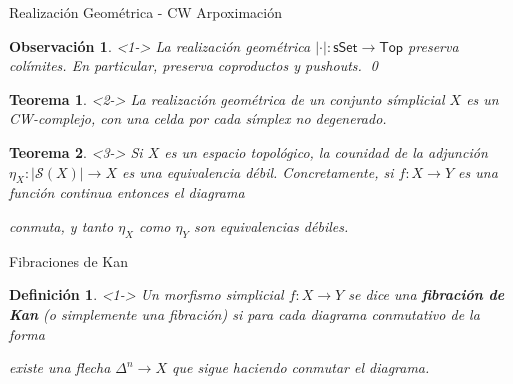 \documentclass[11pt]{beamer}
\newcommand{\cat}[1]{\mathsf{#1}}
\renewcommand{\ss}[1]{\Delta^{#1}}
\newcommand{\horn}[2]{\Lambda^{#1}_{#2}}
\newtheorem{defs}{Definición}
\newtheorem{teo}{Teorema}
\newtheorem{obs}{Observación}
\begin{document}
\begin{frame}{Realización Geométrica - CW Arpoximación}
\begin{obs} <1-> La realización geométrica $| \cdot | : \cat{sSet} \to \cat{Top}$ preserva colímites. En particular, preserva coproductos y pushouts. \qed
\end{obs}

\begin{teo} <2-> La realización geométrica de un conjunto símplicial $X$ es un CW-complejo, con una celda por cada símplex no degenerado.
\end{teo}

\begin{teo} <3-> Si $X$ es un espacio topológico, la counidad de la adjunción $\eta_X : |\mathscr{S}(X)|\to X$ es una equivalencia débil. Concretamente, si $f : X \to Y$ es una función continua entonces el diagrama
\begin{center}
\end{center}
conmuta, y tanto $\eta_X$ como $\eta_Y$ son equivalencias débiles.
\end{teo}
\end{frame}

\begin{frame}{Fibraciones de Kan}
\begin{defs} <1-> Un morfismo simplicial $f : X \to Y$ se dice una \textbf{fibración de Kan} (o simplemente una fibración) si para cada diagrama conmutativo de la forma
\begin{center}
\end{center}
existe una flecha $\ss{n} \to X$ que sigue haciendo conmutar el diagrama.
\end{defs}
\end{frame}
\end{document}
